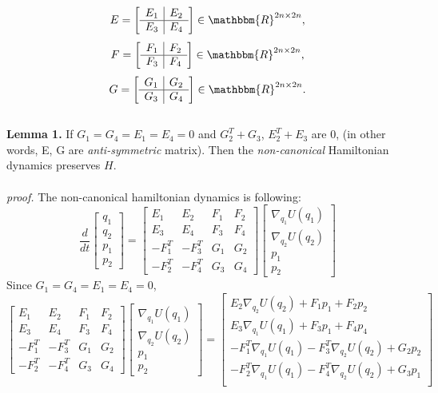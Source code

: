 \documentclass{article}
\begin{document}
\[
E=
\left[
\begin{array}{c|c}
E_1 & E_2 \\
\hline
E_3 & E_4
\end{array}
\right] \in \mathbbm{R}^{2n \times 2n},
\]
\[
F=
\left[
\begin{array}{c|c}
F_1 & F_2 \\
\hline
F_3 & F_4
\end{array}
\right] \in \mathbbm{R}^{2n \times 2n},
\]
\[
G=
\left[
\begin{array}{c|c}
G_1 & G_2 \\
\hline
G_3 & G_4
\end{array}
\right] \in \mathbbm{R}^{2n \times 2n}.
\]
\\
\noindent \textbf{Lemma 1.}  If $G_1 = G_4 = E_1 = E_4  = 0$ and $G_2^T + G_3$, $E_2^T + E_3$ are 0, (in other words, E, G are \textit{anti-symmetric} matrix). Then the \textit{non-canonical} Hamiltonian dynamics preserves $H$.
\\
\\
\textit{proof.} The non-canonical hamiltonian dynamics is following: 
\[
\frac{d}{dt}
\left[
\begin{array}{ccc}
q_1 \\
q_2 \\
p_1 \\
p_2 
\end{array}
\right]
=
\left[
\begin{array}{cclcc}
E_{1} & E_{2} & F_{1} & F_{2} \\
E_3 & E_4 & F_3 & F_4 \\
-F_1^T & -F_3^T & G_1 & G_2 \\
-F_2^T & -F_4^T & G_3 & G_4 
\end{array}
\right]
\left[
\begin{array}{ccc}
\nabla_{q_1} U(q_1) \\
\nabla_{q_2} U(q_2) \\
p_1 \\
p_2 
\end{array}
\right]
\] 
Since $G_1 = G_4 = E_1 = E_4  = 0$,
\[
\left[
\begin{array}{cclcc}
E_{1} & E_{2} & F_{1} & F_{2} \\
E_3 & E_4 & F_3 & F_4 \\
-F_1^T & -F_3^T & G_1 & G_2 \\
-F_2^T & -F_4^T & G_3 & G_4 
\end{array}
\right]
\left[
\begin{array}{ccc}
\nabla_{q_1} U(q_1) \\
\nabla_{q_2} U(q_2) \\
p_1 \\
p_2 
\end{array}
\right] = 
\left[
\begin{array}{ccc}
E_2 \nabla_{q_2} U(q_2) + F_1 p_1 + F_2 p_2 \\
E_3 \nabla_{q_1} U(q_1) + F_3 p_1 + F_4 p_4 \\
-F_1^T \nabla_{q_1} U(q_1) - F_3^T \nabla_{q_2} U(q_2)  + G_2 p_2\\
-F_2^T \nabla_{q_1} U(q_1) - F_4^T \nabla_{q_2} U(q_2)  + G_3 p_1\\
\end{array}
\right]
\] 
\end{document}
